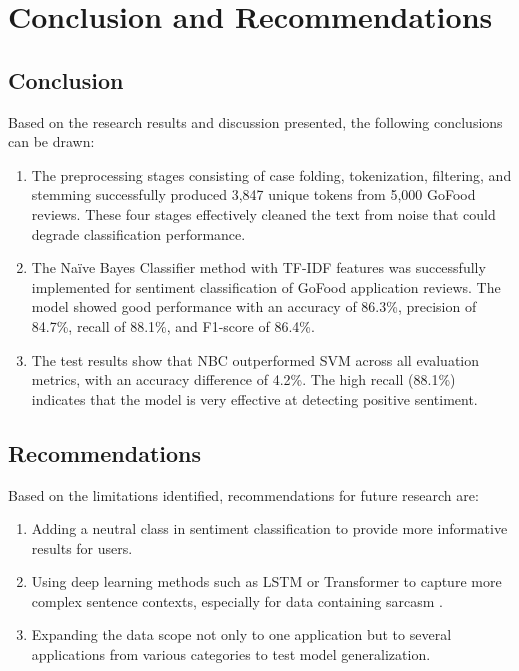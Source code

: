\chapter{Conclusion and Recommendations}

\section{Conclusion}

Based on the research results and discussion presented, the following conclusions can be drawn:

\begin{enumerate}
  \item The preprocessing stages consisting of case folding, tokenization, filtering, and stemming successfully produced 3,847 unique tokens from 5,000 GoFood reviews. These four stages effectively cleaned the text from noise that could degrade classification performance.
  \item The Na\"ive Bayes Classifier method with TF-IDF features was successfully implemented for sentiment classification of GoFood application reviews. The model showed good performance with an accuracy of 86.3\%, precision of 84.7\%, recall of 88.1\%, and F1-score of 86.4\%.
  \item The test results show that NBC outperformed SVM across all evaluation metrics, with an accuracy difference of 4.2\%. The high recall (88.1\%) indicates that the model is very effective at detecting positive sentiment.
\end{enumerate}

\section{Recommendations}

Based on the limitations identified, recommendations for future research are:

\begin{enumerate}
  \item Adding a neutral class in sentiment classification to provide more informative results for users.
  \item Using deep learning methods such as LSTM or Transformer to capture more complex sentence contexts, especially for data containing sarcasm \cite{zhang2020}.
  \item Expanding the data scope not only to one application but to several applications from various categories to test model generalization.
\end{enumerate}

